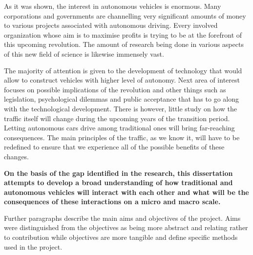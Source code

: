 \documentclass[11pt,english,twoside]{article}
\begin{document}
\par



As it was shown, the interest in autonomous vehicles is enormous. Many corporations and governments are channelling very significant amounts of money to various projects associated with autonomous driving. Every involved organization whose aim is to maximise profits is trying to be at the forefront of this upcoming revolution. The amount of research being done in various aspects of this new field of science is likewise immensely vast. 
\par
The majority of attention is given to the development of technology that would allow to construct vehicles with higher level of autonomy. Next area of interest focuses on possible implications of the revolution and other things such as legislation, psychological dilemmas and public acceptance that has to go along with the technological development. There is however, little study on how the traffic itself will change during the upcoming years of the transition period. Letting autonomous cars drive among traditional ones will bring far-reaching consequences. The main principles of the traffic, as we know it, will have to be redefined to ensure that we experience all of the possible benefits of these changes. 
\par
\textbf{On the basis of the gap identified in the research, this dissertation attempts to develop a broad understanding of how traditional and autonomous vehicles will interact with each other and what will be the consequences of these interactions on a micro and macro scale.}





\par 
Further paragraphs describe the main aims and objectives of the project. Aims were distinguished from the objectives as being more abstract and relating rather to contribution while objectives are more tangible and define specific methods used in the project.



\end{document}
